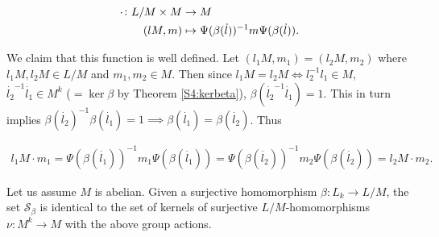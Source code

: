 \begin{align*}
    \cdot \colon L/M \times M &\rightarrow M \\
                (lM, m)  &\mapsto \Psi(\beta(\dot{l}))^{-1}m\Psi(\beta(\dot{l})).
\end{align*}

We claim that this function is well defined. 
Let $(l_1M, m_1) = (l_2M, m_2)$ where $l_1M, l_2M \in L/M$ and $m_1, m_2 \in M$. Then since $l_1M = l_2M \iff l_2^{-1}l_1 \in M$, $\dot{l_2}^{-1}\dot{l_1} \in M^k$ ($= \ker \beta$ by Theorem \ref{S4:kerbeta}), $\beta(\dot{l_2}^{-1}\dot{l_1}) = 1$. 
This in turn implies $ \beta(\dot{l_2})^{-1}\beta(\dot{l_1}) = 1 \implies \beta(\dot{l_1}) = \beta(\dot{l_2})$. 
Thus 

\begin{align*}
    l_1M \cdot m_1 = \Psi(\beta(\dot{l_1}))^{-1}m_1\Psi(\beta(\dot{l_1})) = \Psi(\beta(\dot{l_2}))^{-1}m_2\Psi(\beta(\dot{l_2})) = l_2M \cdot m_2.
\end{align*}

\begin{theorem}
    \label{S4:LMhom}
    Let us assume $M$ is abelian. Given a surjective homomorphism $\beta \colon L_k \rightarrow L/M$, the set $\mathscr{S}_\beta$ is identical to the set of kernels of surjective $L/M$-homomorphisms $\nu \colon M^k \rightarrow M$ with the above group actions.
\end{theorem}


